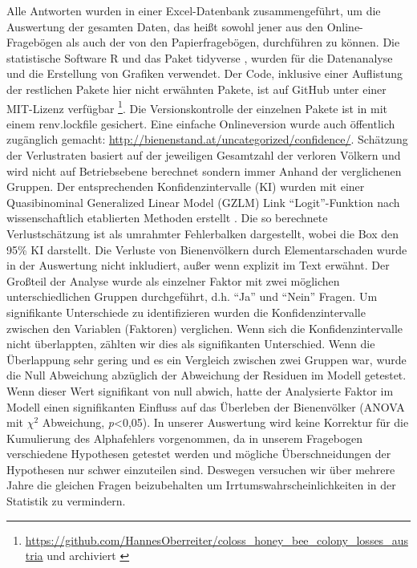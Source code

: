 Alle Antworten wurden in einer Excel-Datenbank zusammengeführt, um die Auswertung der gesamten Daten, das heißt sowohl jener aus den Online-Fragebögen als auch der von den Papierfragebögen, durchführen zu können. Die statistische Software R \citep{rcoreteam2020} und das Paket tidyverse \citep{wickham2019}, wurden für die Datenanalyse und die Erstellung von Grafiken verwendet. Der Code, inklusive einer Auflistung der restlichen Pakete hier nicht erwähnten Pakete, ist auf GitHub unter einer MIT-Lizenz verfügbar \footnote{\url{https://github.com/HannesOberreiter/coloss_honey_bee_colony_losses_austria} und archiviert \cite{HannesOberreiter2019}}. Die Versionskontrolle der einzelnen Pakete ist in mit einem renv.lockfile gesichert. Eine einfache Onlineversion wurde auch öffentlich zugänglich gemacht: \url{http://bienenstand.at/uncategorized/confidence/}.
\newline
Schätzung der Verlustraten basiert auf der jeweiligen Gesamtzahl der verloren Völkern und wird nicht auf Betriebsebene berechnet sondern immer Anhand der verglichenen Gruppen. Der entsprechenden Konfidenzintervalle (KI) wurden mit einer Quasibinominal Generalized Linear Model (GZLM) Link \enquote{Logit}-Funktion nach wissenschaftlich etablierten Methoden erstellt \citep{vanderzee2013}. Die so berechnete Verlustschätzung ist als umrahmter Fehlerbalken dargestellt, wobei die Box  den 95\% KI darstellt. Die Verluste von Bienenvölkern durch Elementarschaden wurde in der Auswertung nicht inkludiert, außer wenn explizit im Text erwähnt.
\newline
Der Großteil der Analyse wurde als einzelner Faktor mit zwei möglichen unterschiedlichen Gruppen durchgeführt, d.h. \enquote{Ja} und \enquote{Nein} Fragen. Um signifikante Unterschiede zu identifizieren wurden die Konfidenzintervalle zwischen den Variablen (Faktoren) verglichen. Wenn sich die Konfidenzintervalle nicht überlappten, zählten wir dies als signifikanten Unterschied. Wenn die Überlappung sehr gering und es ein Vergleich zwischen zwei Gruppen war, wurde die Null Abweichung abzüglich der Abweichung der Residuen im Modell getestet. Wenn dieser Wert signifikant von null abwich, hatte der Analysierte Faktor im Modell einen signifikanten Einfluss auf das Überleben der Bienenvölker (ANOVA mit $\chi^{2}$ Abweichung, \textit{p}<0,05).
\newline
In unserer Auswertung wird keine Korrektur für die Kumulierung des Alphafehlers vorgenommen, da in unserem Fragebogen verschiedene Hypothesen getestet werden und mögliche Überschneidungen der Hypothesen nur schwer einzuteilen sind. Deswegen versuchen wir über mehrere Jahre die gleichen Fragen beizubehalten um Irrtumswahrscheinlichkeiten in der Statistik zu vermindern.
